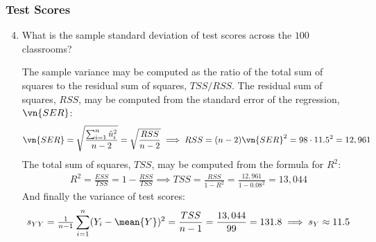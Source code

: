 \begin{frame}
\frametitle{Test Scores}
\ask

\begin{enumerate}\setcounter{enumi}{3}

\item What is the sample standard deviation of test scores across the $100$ classrooms?

\begin{answer}
The sample variance may be computed as the ratio of the total sum of squares to the residual sum of squares, $TSS/RSS$. 
The residual sum of squares, $RSS$, may be computed from the standard error of the regression, $\vn{SER}$:
\begin{align*}
\vn{SER} = \sqrt{\frac{\sum_{i=1}^{n}\hat{u}_{i}^2}{n-2}}
    = \sqrt{\frac{RSS}{n-2}}
\implies
RSS = (n-2) \vn{SER}^2
    = 98 \cdot 11.5^2
    = 12,961
\end{align*}
The total sum of squares, $TSS$, may be computed from the formula for $R^{2}$:
\begin{align*}
R^2 = \frac{ESS}{TSS}
    = 1 - \frac{RSS}{TSS}
\implies
TSS = \frac{RSS}{1-R^2}
    = \frac{12,961}{1-0.08^2}
    = 13,044
\end{align*}
And finally the variance of test scores:
\begin{align*}
s_{YY} 
    = \tfrac{1}{n-1}\sum_{i=1}^{n}(Y_{i}-\mean{Y})^2
    = \frac{TSS}{n-1}
    = \frac{13,044}{99}
    = 131.8
\implies
s_{Y} \approx 11.5 
\end{align*}
\end{answer}

\end{enumerate}
\end{frame}


